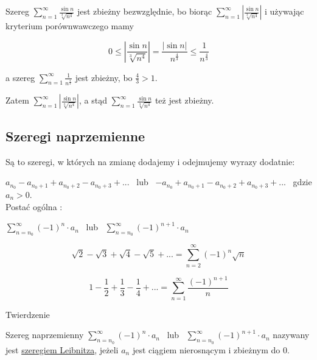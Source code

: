 \begin{przyklad}

Szereg $ \sum\limits_{n=1}^{\infty} \frac{\sin n}{\sqrt[3]{n^4}} $ jest zbieżny bezwzględnie, bo biorąc
$ \sum\limits_{n=1}^{\infty} \left| \frac{\sin n}{\sqrt[3]{n^4}} \right| $ i używając kryterium porównwawczego mamy

$$ 0 \leq \left| \frac{\sin n}{\sqrt[3]{n^4}} \right| = \frac{|\sin n|}{n^{\frac{4}{3}}} \leq \frac{1}{n^{\frac{4}{3}}} $$

a szereg $ \sum\limits_{n=1}^{\infty} \frac{1}{n^{\frac{4}{3}}} $ jest zbieżny, bo $ \frac{4}{3} > 1 $. 

Zatem
$ \sum\limits_{n=1}^{\infty} \left| \frac{\sin n}{\sqrt[3]{n^4}} \right| $, a stąd
$\sum\limits_{n=1}^{\infty} \frac{\sin n}{\sqrt[3]{n^4}}$ też jest zbieżny.
\end{przyklad}


\subsection*{Szeregi naprzemienne}

Są to szeregi, w których na zmianę dodajemy i odejmujemy wyrazy dodatnie:

$ a_{n_0} - a_{n_0 + 1} + a_{n_0 + 2} - a_{n_0 + 3} + ... $ \ lub \ $ -a_{n_0} + a_{n_0 + 1} - a_{n_0 + 2} + a_{n_0 + 3} + ...  $ \
gdzie $a_n > 0$. \\

Postać ogólna :

$ \sum\limits_{n = n_0}^{\infty} (-1)^n \cdot a_n $ \ lub \ $ \sum\limits_{n = n_0}^{\infty} (-1)^{n+1} \cdot a_n $ \\

\begin{przyklad}

$$ \sqrt{2} - \sqrt{3} + \sqrt{4} - \sqrt{5} + ... = \sum\limits_{n=2}^{\infty} (-1)^n \sqrt{n} $$

$$ 1 - \frac{1}{2} + \frac{1}{3} - \frac{1}{4} + ... = \sum\limits_{n=1}^{\infty} \frac{(-1)^{n+1}}{n} $$
\end{przyklad}

\begin{tw}{Twierdzenie}

Szereg naprzemienny $ \sum\limits_{n = n_0}^{\infty} (-1)^n \cdot a_n $ \ lub \ $ \sum\limits_{n = n_0}^{\infty} (-1)^{n+1} \cdot a_n $
nazywany jest \underline{szeregiem Leibnitza}, jeżeli $a_n$ jest ciągiem nierosnącym i zbieżnym do 0.
\end{tw}

